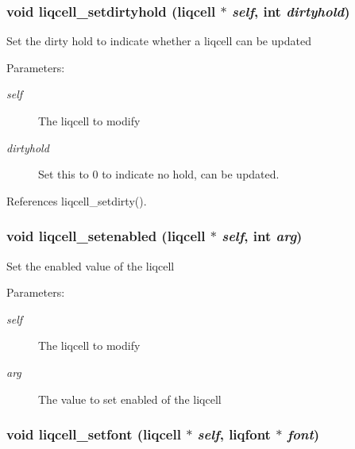 \subsubsection[{liqcell\_\-setdirtyhold}]{\setlength{\rightskip}{0pt plus 5cm}void liqcell\_\-setdirtyhold (liqcell $\ast$ {\em self}, \/  int {\em dirtyhold})}\label{d5/da2/liqcell_8c_d2d331cc053cb8bce4f328ca5f0f6913}


Set the dirty hold to indicate whether a liqcell can be updated \begin{Desc}
\item[Parameters:]
\begin{description}
\item[{\em self}]The liqcell to modify \item[{\em dirtyhold}]Set this to 0 to indicate no hold, can be updated. \end{description}
\end{Desc}


References liqcell\_\-setdirty().
\subsubsection[{liqcell\_\-setenabled}]{\setlength{\rightskip}{0pt plus 5cm}void liqcell\_\-setenabled (liqcell $\ast$ {\em self}, \/  int {\em arg})}\label{d5/da2/liqcell_8c_3d63be74972f519f17406bd677adfdfc}


Set the enabled value of the liqcell \begin{Desc}
\item[Parameters:]
\begin{description}
\item[{\em self}]The liqcell to modify \item[{\em arg}]The value to set enabled of the liqcell \end{description}
\end{Desc}
\subsubsection[{liqcell\_\-setfont}]{\setlength{\rightskip}{0pt plus 5cm}void liqcell\_\-setfont (liqcell $\ast$ {\em self}, \/  liqfont $\ast$ {\em font})}\label{d5/da2/liqcell_8c_bb948216eb0615940667c825814a16d3}


